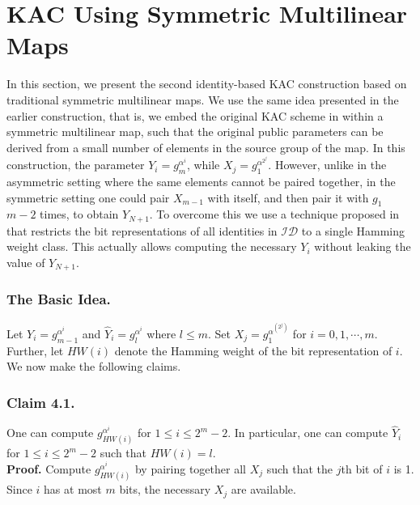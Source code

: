 \section{KAC Using Symmetric Multilinear Maps}
\label{sec:proposal2}

In this section, we present the second identity-based KAC construction based on traditional symmetric multilinear maps. We use the same idea presented in the earlier construction, that is, we embed the original KAC scheme in \cite{patranabis2015dynamic} within a symmetric multilinear map, such that the original public parameters can be derived from a small number of elements in the source group of the map. In this construction, the parameter $Y_i=g^{\alpha^i}_m$, while $X_j=g^{\alpha^{2^j}}_1$. However, unlike in the asymmetric setting where the same elements cannot be paired together, in the symmetric setting one could pair $X_{m-1}$ with itself, and then pair it with $g_1$ $m-2$ times, to obtain $Y_{N+1}$. To overcome this we use a technique proposed in \cite{boneh2014low} that restricts the bit representations of all identities in $\mathcal{ID}$ to a single Hamming weight class. This actually allows computing the necessary $Y_i$ without leaking the value of $Y_{N+1}$.

\subsubsection{The Basic Idea.} Let $Y_i=g^{\alpha^i}_{m-1}$ and $\hat{Y}_i=g^{\alpha^i}_l$ where $l\leq m$. Set $X_j=g^{\alpha^{(2^j)}}_1$ for $i=0,1,\cdots,m$. Further, let $HW(i)$ denote the Hamming weight of the bit representation of $i$. We now make the following claims.

\subsubsection{Claim 4.1.} One can compute $g^{\alpha^i}_{HW(i)}$ for $1\leq i\leq 2^m-2$. In particular, one can compute $\hat{Y}_i$ for $1\leq i\leq 2^m-2$ such that $HW(i)=l$.\\

\noindent\textbf{Proof.} Compute $g^{\alpha^i}_{HW(i)}$ by pairing together all $X_j$ such that the $j$th bit of $i$ is 1. Since $i$ has at most $m$ bits, the necessary $X_j$ are available. 

% 


